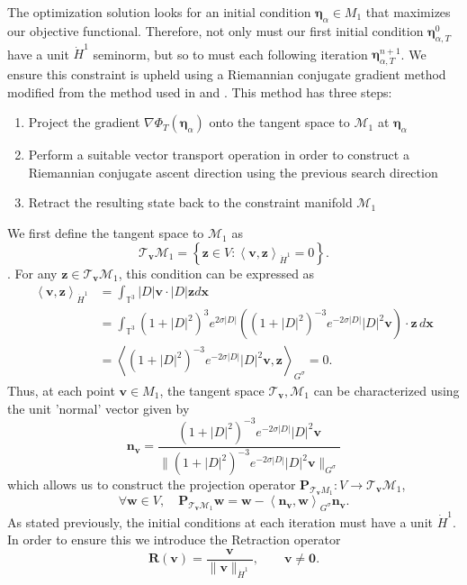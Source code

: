 \documentclass[12pt]{article}
\newcommand{\la}{\left\langle}
\newcommand{\ra}{\right\rangle}
\newcommand{\lb}{\left\lbrace}
\newcommand{\rb}{\right\rbrace}
\def\hdo{\dot{H}^1}
\def\v{\boldsymbol v}
\def\x{\boldsymbol x}
\def\z{\boldsymbol z}
\def\n{\boldsymbol n}
\def\w{\boldsymbol w}
\def\be{\boldsymbol \eta}
\def\bea{\boldsymbol \eta_\alpha}
\def\TT{\mathbb{T}}
\def\M{\mathcal{M}}
\def\T{\mathcal{T}}
\def\P{\mathbf{P}}
\def\R{\mathbf{R}}
\numberwithin{equation}{section}
\begin{document}
The optimization solution looks for an initial condition $\bea \in M_1$ that maximizes our objective functional. Therefore, not only must our first initial condition $\be^0_{\alpha,T}$ have a unit $\hdo$ seminorm, but so to must each following iteration $\be_{\alpha,T}^{n+1}$. We ensure this constraint is upheld using a Riemannian conjugate gradient method modified from the method used in \cite{protas_systematic_2022} and \cite{danaila_computation_2017}. This method has three steps: 
\begin{enumerate}
  \item Project the gradient $\nabla\Phi_T(\bea)$ onto the tangent space to $\M_1$ at $\bea$
  \item Perform a suitable vector transport operation in order to construct a Riemannian conjugate ascent direction using the previous search direction
  \item Retract the resulting state back to the constraint manifold $\M_1$
\end{enumerate}
We first define the tangent space to $\M_1$ as
$$\T_{\v}\M_1 = \lb \z\in V : \la \v,\z\ra_{\hdo}=0\rb.$$.
For any $\z\in \T_{\v}\M_1$, this condition can be expressed as
\begin{subequations}
\begin{align}
\la \v,\z\ra_{\hdo} &= \int_{\TT^3}|D|\v\cdot|D|\z d\x \\
&= \int_{\TT^3} (1+|D|^2)^3e^{2\sigma|D|}\left((1+|D|^2)^{-3}e^{-2\sigma|D|}|D|^2\v\right)\cdot\z \,d\x \\
&= \la (1+|D|^2)^{-3}e^{-2\sigma|D|}|D|^2\v,\z\ra_{G^\sigma} = 0.
\end{align}
\end{subequations}
Thus, at each point $\v\in M_1$, the tangent space $\T_{\v},\M_1$ can be characterized using the unit 'normal' vector given by 
\begin{equation}
\n_{\v} = \frac{(1+|D|^2)^{-3}e^{-2\sigma|D|}|D|^2\v}{\|(1+|D|^2)^{-3}e^{-2\sigma|D|}|D|^2\v\|_{G^\sigma}}
\end{equation}
which allows us to construct the projection operator $\P_{\T_{\v}M_1}: V \rightarrow \T_{\v}\M_1$, 
\begin{equation}
\forall \w \in V, \quad \P_{\T_{\v}\M_1}\w = \w - \la \n_{\v}, \w \ra_{G^\sigma}\n_{\v}.
\end{equation}
As stated previously, the initial conditions at each iteration must have a unit $\hdo$. In order to ensure this we introduce the Retraction operator
\begin{equation}
\R(\v) = \frac{\v}{\|\v\|_{\hdo}}, \qquad \v\neq \boldsymbol 0.
\end{equation}
\end{document}
